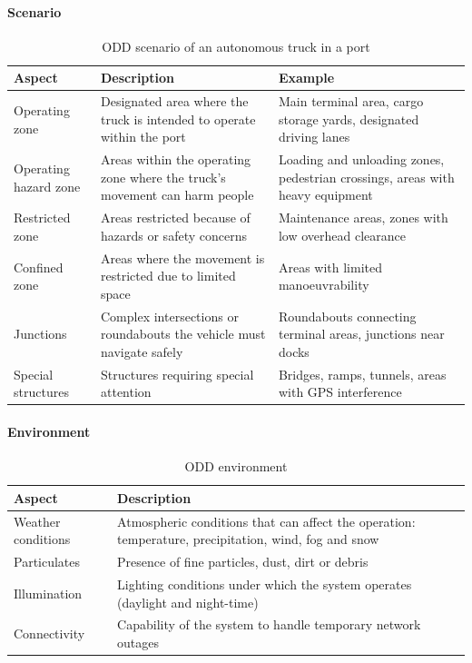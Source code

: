\paragraph{Scenario}
\begin{table}[H]
    \centering
    \small
    \begin{tabular}{|p{2.6cm}|p{6.3cm}|p{6.3cm}|}
        \hline
        \textbf{Aspect} & \textbf{Description} & \textbf{Example} \\
        \hline
        Operating zone & Designated area where the truck is intended to operate within the port & Main terminal area, cargo storage yards, designated driving lanes \\
        \hline
        Operating hazard zone & Areas within the operating zone where the truck's movement can harm people & Loading and unloading zones, pedestrian crossings, areas with heavy equipment \\
        \hline
        Restricted zone & Areas restricted because of hazards or safety concerns & Maintenance areas, zones with low overhead clearance \\
        \hline
        Confined zone & Areas where the movement is restricted due to limited space & Areas with limited manoeuvrability \\
        \hline
        Junctions & Complex intersections or roundabouts the vehicle must navigate safely & Roundabouts connecting terminal areas, junctions near docks \\
        \hline
        Special structures & Structures requiring special attention & Bridges, ramps, tunnels, areas with GPS interference \\
        \hline
    \end{tabular}
    \caption{ODD scenario of an autonomous truck in a port}
\end{table}

\paragraph{Environment}
\begin{table}[H]
    \centering
    \small
    \begin{tabular}{|p{3cm}|p{12.2cm}|}
        \hline
        \textbf{Aspect} & \textbf{Description} \\
        \hline
        Weather conditions & Atmospheric conditions that can affect the operation: temperature, precipitation, wind, fog and snow \\
        \hline
        Particulates & Presence of fine particles, dust, dirt or debris \\
        \hline
        Illumination & Lighting conditions under which the system operates (daylight and night-time) \\
        \hline
        Connectivity & Capability of the system to handle temporary network outages \\
        \hline
    \end{tabular}
    \caption{ODD environment}
\end{table}


